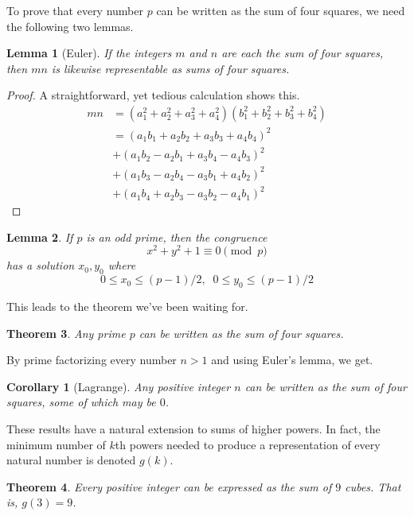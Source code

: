 \documentclass{article}
\newtheorem{theorem}{Theorem}[section]
\newtheorem{lemma}[theorem]{Lemma}
\newtheorem{corollary}{Corollary}[theorem]
\theoremstyle{remark}
\theoremstyle{definition}
\begin{document}
To prove that every number $p$ can be written as the sum of four squares, we need the following two lemmas. 

\begin{lemma}[Euler]
If the integers $m$ and $n$ are each the sum of four squares, then $m n$ is likewise representable as sums of four squares. 
\end{lemma}
\begin{proof}
A straightforward, yet tedious calculation shows this. 
\begin{align*}
    m n & = (a_1^2 + a_2^2 + a_3^2 + a_4^2) (b_1^2 + b_2^2 + b_3^2 + b_4^2) \\
    & = (a_1 b_1 + a_2 b_2 + a_3 b_3 + a_4 b_4)^2 \\
    & + (a_1 b_2 - a_2 b_1 + a_3 b_4 - a_4 b_3)^2 \\
    & + (a_1 b_3 - a_2 b_4 - a_3 b_1 + a_4 b_2)^2 \\
    & + (a_1 b_4 + a_2 b_3 - a_3 b_2 - a_4 b_1)^2
\end{align*}
\end{proof}

\begin{lemma}
If $p$ is an odd prime, then the congruence 
\[x^2 + y^2 + 1 \equiv 0 \pmod{p}\]
has a solution $x_0, y_0$ where 
\[0 \leq x_0 \leq (p-1)/2, \;\; 0 \leq y_0 \leq (p-1)/2\]
\end{lemma}

This leads to the theorem we've been waiting for. 

\begin{theorem}
Any prime $p$ can be written as the sum of four squares. 
\end{theorem}

By prime factorizing every number $n>1$ and using Euler's lemma, we get. 

\begin{corollary}[Lagrange]
Any positive integer $n$ can be written as the sum of four squares, some of which may be $0$. 
\end{corollary}

These results have a natural extension to sums of higher powers. In fact, the minimum number of $k$th powers needed to produce a representation of every natural number is denoted $g(k)$. 

\begin{theorem}
Every positive integer can be expressed as the sum of $9$ cubes. That is, $g(3) = 9$. 
\end{theorem}
\end{document}
